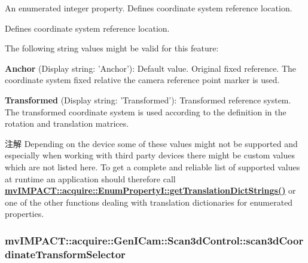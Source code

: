 An enumerated integer property. Defines coordinate system reference location. 

Defines coordinate system reference location.

The following string values might be valid for this feature\+:
\begin{DoxyItemize}
\item {\bfseries Anchor} (Display string\+: 'Anchor')\+: Default value. Original fixed reference. The coordinate system fixed relative the camera reference point marker is used.
\item {\bfseries Transformed} (Display string\+: 'Transformed')\+: Transformed reference system. The transformed coordinate system is used according to the definition in the rotation and translation matrices.
\end{DoxyItemize}

\begin{DoxyNote}{注解}
Depending on the device some of these values might not be supported and especially when working with third party devices there might be custom values which are not listed here. To get a complete and reliable list of supported values at runtime an application should therefore call {\bfseries \hyperlink{classmv_i_m_p_a_c_t_1_1acquire_1_1_enum_property_i_a0ba6ccbf5ee69784d5d0b537924d26b6}{mv\+I\+M\+P\+A\+C\+T\+::acquire\+::\+Enum\+Property\+I\+::get\+Translation\+Dict\+Strings()}} or one of the other functions dealing with translation dictionaries for enumerated properties. 
\end{DoxyNote}
\hypertarget{classmv_i_m_p_a_c_t_1_1acquire_1_1_gen_i_cam_1_1_scan3d_control_ae1747ee2575736760337915cafba819d}{
\subsubsection[{scan3d\+Coordinate\+Transform\+Selector}]{ mv\+I\+M\+P\+A\+C\+T\+::acquire\+::\+Gen\+I\+Cam\+::\+Scan3d\+Control\+::scan3d\+Coordinate\+Transform\+Selector}}\label{classmv_i_m_p_a_c_t_1_1acquire_1_1_gen_i_cam_1_1_scan3d_control_ae1747ee2575736760337915cafba819d}


